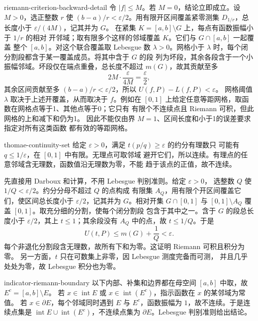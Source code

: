 \begin{solution}{riemann-criterion-backward-detail}
令 \(|f|\le M\)。若 \(M=0\)，结论立即成立。设 \(M>0\)，选正整数
\(r\) 使 \((b-a)/r<\varepsilon/2\)。用有限开区间覆盖紧零测集
\(D_{1/r}\)，总长度小于 \(\varepsilon/(4M)\)，记其并为 \(G\)。
在紧集 \(K=[a,b]\setminus G\) 上，每点有函数振幅小于 \(1/r\) 的相对
开邻域；取有限多个这样的邻域覆盖 \(K\)。它们与 \(G\cap[a,b]\) 一起覆盖
整个 \([a,b]\)。对这个联合覆盖取 Lebesgue 数 \(\lambda>0\)。网格小于
\(\lambda\) 时，每个闭分割段都含于某一覆盖成员。将其中含于 \(G\) 的段
列为坏段，其余各段含于一个小振幅邻域。坏段仅在端点重叠，总长度不超过
\(m(G)\)，故其贡献至多
\[
 2M\cdot\frac{\varepsilon}{4M}=\frac\varepsilon2,
\]
其余区间贡献至多 \((b-a)/r<\varepsilon/2\)，所以 \(U(f,P)-L(f,P)<\varepsilon\)。
网格阈值 \(\lambda\) 取决于上述开覆盖，从而取决于 \(f\)。例如在
\([0,1]\) 上给定任意等距网格，取函数在网格点等于1、其他点等于0；它只有
有限个不连续点且 Riemann 可积，但此网格的上和减下和仍为1。
因此不能仅由界 \(M=1\)、区间长度和小于1的误差要求指定对所有这类函数
都有效的等距网格。
\end{solution}

\begin{solution}{thomae-continuity-set}
给定 \(\varepsilon>0\)，满足 \(t(p/q)\ge\varepsilon\) 的约分有理数只
可能有 \(q\le1/\varepsilon\)，在 \([0,1]\) 中有限。无理点可取邻域
避开它们，所以连续。有理点的任意邻域含无理数，函数值沿无理数为零，不能
趋于该点的正值，故不连续。

先直接用 Darboux 和计算，不用 Lebesgue 判别准则。给定 \(\varepsilon>0\)，
选整数 \(Q\) 使 \(1/Q<\varepsilon/2\)。约分分母不超过 \(Q\) 的点构成
有限集 \(A_Q\)，用有限个开区间覆盖它们，使区间总长度小于
\(\varepsilon/2\)，记其并为 \(G\)。相对开集 \(G\cap[0,1]\) 与
\([0,1]\setminus A_Q\) 覆盖 \([0,1]\)。取充分细的分割，使每个闭分割段
包含于其中之一。含于 \(G\) 的段总长度小于 \(\varepsilon/2\)，其上
\(t\le1\)；其余段没有 \(A_Q\) 中的点，故 \(t\le1/Q\)。于是
\[
 U(t,P)\le m(G)+\frac1Q<\varepsilon.
\]
每个非退化分割段含无理数，故所有下和为零。这证明 Riemann 可积且积分为零。
另一方面，\(t\) 只在可数集上非零，因 Lebesgue 测度完备而可测，
并且几乎处处为零，故 Lebesgue 积分也为零。
\end{solution}

\begin{solution}{indicator-riemann-boundary}
以下内部、补集和边界都在母空间 \([a,b]\) 中取，故 \(E^c=[a,b]\setminus E\)。
若 \(x\in\operatorname{int}E\) 或
\(x\in\operatorname{int}(E^c)\)，指示函数在 \(x\) 的某邻域为常值。
若 \(x\in\partial E\)，每个邻域同时遇到 \(E\) 与 \(E^c\)，函数振幅为
\(1\)，故不连续。于是连续点集是
\(\operatorname{int}E\cup\operatorname{int}(E^c)\)，不连续点集为
\(\partial E\)。Lebesgue 判别准则给出结论。
\end{solution}

